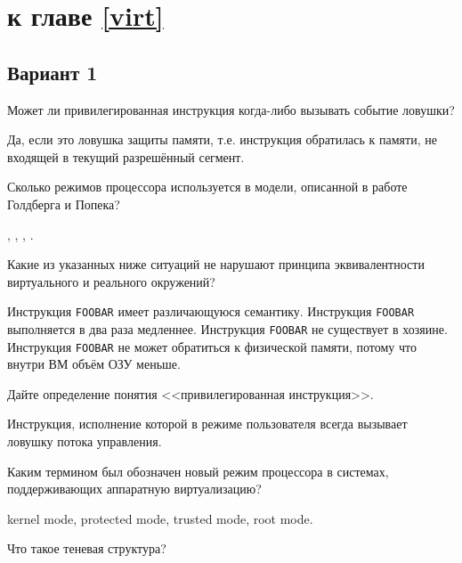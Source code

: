 \section{\Questions к главе \ref{virt}} %

\subsection*{Вариант 1}

\begin{questions}
\question[3] Может ли привилегированная инструкция когда-либо вызывать событие ловушки?
\begin{solution}[1cm]
Да, если это ловушка защиты памяти, т.е. инструкция обратилась к памяти, не входящей в текущий разрешённый сегмент.
\end{solution}

\question[1] Сколько режимов процессора используется в модели, описанной в работе Голдберга и Попека?
\begin{choices}
    ,
    ,
    ,
    .
\end{choices}

\question[3] Какие из указанных ниже ситуаций не нарушают принципа эквивалентности виртуального и реального окружений?
\begin{choices}
    \choice Инструкция \texttt{FOOBAR} имеет различающуюся семантику.
    \correctchoice Инструкция \texttt{FOOBAR} выполняется в два раза медленнее.
    \choice Инструкция \texttt{FOOBAR} не существует в хозяине.
    \correctchoice Инструкция \texttt{FOOBAR} не может обратиться к физической памяти, потому что внутри ВМ объём ОЗУ меньше.
\end{choices}

\question[3] Дайте определение понятия <<привилегированная инструкция>>.
\begin{solution}[1cm]
Инструкция, исполнение которой в режиме пользователя всегда вызывает ловушку потока управления.
\end{solution}

\question[3] Каким термином был обозначен новый режим процессора в системах, поддерживающих аппаратную виртуализацию?
\begin{choices}
    \choice kernel mode,
    \choice protected mode,
    \choice trusted mode,
    \correctchoice root mode.
\end{choices}

\question[3] Что такое теневая структура? \todo
\begin{choices}
    \choice 
    \correctchoice 
\end{choices}


\end{questions}

